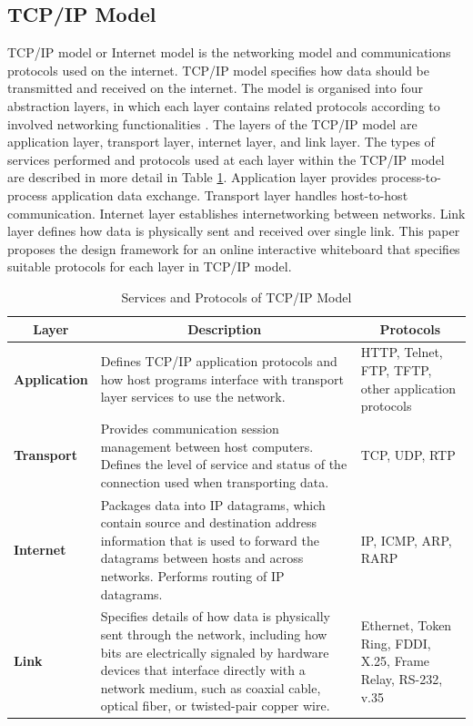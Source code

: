 \documentclass[conference]{IEEEtran}
\begin{document}
\subsection{TCP/IP Model}
TCP/IP model or Internet model is the networking model and communications protocols used on the internet. TCP/IP model specifies how data should be transmitted and received on the internet. The model is organised into four abstraction layers, in which each layer contains related protocols according to involved networking functionalities \cite{RFC1122}\cite{RFC1123}.  The layers of the TCP/IP model are application layer, transport layer, internet layer, and link layer. The types of services performed and protocols used at each layer within the TCP/IP model are described in more detail in Table \ref{tab:1}. Application layer provides process-to-process application data exchange. Transport layer handles host-to-host communication. Internet layer establishes internetworking between networks. Link layer defines how data is physically sent and received over single link. This paper proposes the design framework for an online interactive whiteboard that specifies suitable protocols for each layer in TCP/IP model.
\begin{table}[h]
  \renewcommand{\arraystretch}{2}
  \renewcommand{\tabcolsep}{2mm}
 
  \begin{tabularx}{0.5\textwidth}{|p{1.5cm}|p{4.3cm}|p{2cm}|}
    \hline
    \multicolumn{1}{|c|}{\textbf{Layer}} &  
    \multicolumn{1}{c|}{\textbf{Description}} &
    \multicolumn{1}{c|}{\textbf{Protocols}} \\ \hline
    \textbf{Application} &  Defines TCP/IP application protocols and how host programs interface with transport layer services to use the network. & HTTP, Telnet, FTP, TFTP, other application protocols \\ \hline 
    \textbf{Transport} &  Provides communication session management between host computers. Defines the level of service and status of the connection used when transporting data. & TCP, UDP, RTP \\ \hline 
     \textbf{Internet} &  Packages data into IP datagrams, which contain source and destination address information that is used to forward the datagrams between hosts and across networks. Performs routing of IP datagrams. & IP, ICMP, ARP, RARP \\ \hline 
     \textbf{Link} &  Specifies details of how data is physically sent through the network, including how bits are electrically signaled by hardware devices that interface directly with a network medium, such as coaxial cable, optical fiber, or twisted-pair copper wire. & Ethernet, Token Ring, FDDI, X.25, Frame Relay, RS-232, v.35 \\ \hline 
  \end{tabularx}
  \space
  \caption{Services and Protocols of TCP/IP Model}
  \label{tab:1}
\end{table}
\end{document}
